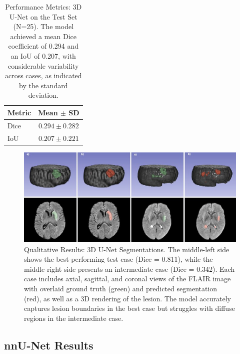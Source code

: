 \documentclass[12pt]{article}
\begin{document}
\begin{table}[tp]
  \centering
    \begin{tabular}{lc}
      \toprule
        Metric & Mean $\pm$ SD \\
      \midrule
        Dice & $0.294 \pm 0.282$ \\
        IoU & $0.207 \pm 0.221$ \\
      \bottomrule
    \end{tabular}
  \caption{Performance Metrics: 3D U-Net on the Test Set (N=25). The model achieved a mean Dice coefficient of 0.294 and an IoU of 0.207, with considerable variability across cases, as indicated by the standard deviation.}\label{tab:unet_metrics}
\end{table}


\begin{figure}[tp]
    \centering
    \includegraphics[width=\textwidth]{figures/Figure 2.jpg}
    \caption{Qualitative Results: 3D U-Net Segmentations. The middle-left side shows the best-performing test case (Dice = 0.811), while the middle-right side presents an intermediate case (Dice = 0.342). Each case includes axial, sagittal, and coronal views of the FLAIR image with overlaid ground truth (green) and predicted segmentation (red), as well as a 3D rendering of the lesion. The model accurately captures lesion boundaries in the best case but struggles with diffuse regions in the intermediate case.}\label{fig:unet_qualitative}
\end{figure}


\subsection{nnU-Net Results}\label{subsec:nnu-net}  
\end{document}
